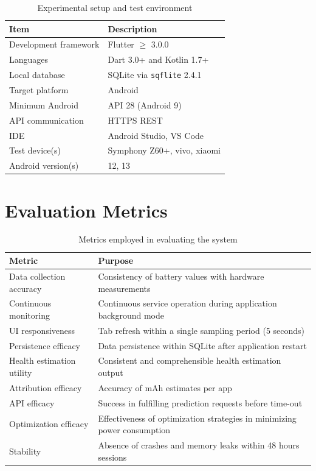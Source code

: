 \documentclass[12pt,a4paper]{report}
\begin{document}
\begin{table}[H]
\caption{Experimental setup and test environment}
\centering
\small
\begin{tabular}{ll}
\toprule
\textbf{Item} & \textbf{Description}\\
\midrule
Development framework  & Flutter $\geq$ 3.0.0\\
Languages              & Dart 3.0+ and Kotlin 1.7+\\
Local database         & SQLite via \texttt{sqflite} 2.4.1\\
Target platform        & Android\\
Minimum Android        & API 28 (Android 9)\\
API communication      & HTTPS REST\\
IDE                    & Android Studio, VS Code\\
Test device(s)         & Symphony Z60+, vivo, xiaomi\\
Android version(s)     & 12, 13\\
\bottomrule
\end{tabular}
\end{table}

\section{Evaluation Metrics}

\begin{table}[H]
  \caption{Metrics employed in evaluating the system}
  \centering
  \small
  \begin{tabular}{ll}
  \toprule
  \textbf{Metric} & \textbf{Purpose}\\
  \midrule
  Data collection accuracy    & Consistency of battery values with hardware measurements\\
  Continuous monitoring      & Continuous service operation during application background mode\\
  UI responsiveness          & Tab refresh within a single sampling period (5 seconds)\\
  Persistence efficacy       & Data persistence within SQLite after application restart\\
  Health estimation utility  & Consistent and comprehensible health estimation output\\
  Attribution efficacy       & Accuracy of mAh estimates per app\\
  API efficacy              & Success in fulfilling prediction requests before time-out\\
  Optimization efficacy      & Effectiveness of optimization strategies in minimizing power consumption\\
  Stability                 & Absence of crashes and memory leaks within 48 hours sessions\\
  \bottomrule
  \end{tabular}
  \end{table}
\end{document}

